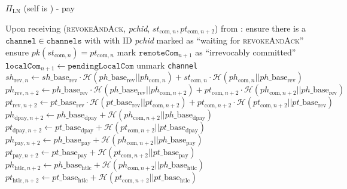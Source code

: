 \begin{protocolbox}{$\Pi_{\mathrm{LN}}$ (self is \alice) - pay}
\begin{algorithmic}[1]
    \State Upon receiving (\textsc{revokeAndAck}, \textit{pchid},
    $st_{\mathrm{com}, n}, pt_{\mathrm{com}, n+2}$) from \bob:
    \Indent
      \State ensure there is a $\mathtt{channel} \in \mathtt{channels}$ with
      \bob{} with ID \textit{pchid} marked as ``waiting for
      \textsc{revokeAndAck}''
      \State ensure $pk\left(st_{\mathrm{com}, n}\right) = pt_{\mathrm{com}, n}$
      \State mark $\mathtt{remoteCom}_{n+1}$ as ``irrevocably committed''
      \State $\mathtt{localCom}_{n+1} \gets \mathtt{pendingLocalCom}$
      \State unmark \texttt{channel}
      \State $sh_{\mathrm{rev}, n} \gets sh\_\mathrm{base}_{\mathrm{rev}} \cdot
      \mathcal{H}\left(ph\_\mathrm{base}_{\mathrm{rev}} || ph_{\mathrm{com},
      n}\right) + st_{\mathrm{com}, n} \cdot \mathcal{H}\left(ph_{\mathrm{com},
      n} || ph\_\mathrm{base}_{\mathrm{rev}}\right)$
      \State $ph_{\mathrm{rev}, n+2} \gets ph\_\mathrm{base}_{\mathrm{rev}}
      \cdot \mathcal{H}\left(ph\_\mathrm{base}_{\mathrm{rev}} ||
      ph_{\mathrm{com}, n+2}\right) + pt_{\mathrm{com}, n+2} \cdot
      \mathcal{H}\left(ph_{\mathrm{com}, n+2} ||
      ph\_\mathrm{base}_{\mathrm{rev}}\right)$
      \State $pt_{\mathrm{rev}, n+2} \gets pt\_\mathrm{base}_{\mathrm{rev}}
      \cdot \mathcal{H}\left(pt\_\mathrm{base}_{\mathrm{rev}} ||
      pt_{\mathrm{com}, n+2}\right) + pt_{\mathrm{com}, n+2} \cdot
      \mathcal{H}\left( pt_{\mathrm{com}, n+2} ||
      pt\_\mathrm{base}_{\mathrm{rev}}\right)$
      \State $ph_{\mathrm{dpay}, n+2} \gets ph\_\mathrm{base}_{\mathrm{dpay}} +
      \mathcal{H}\left(ph_{\mathrm{com}, n+2} ||
      ph\_\mathrm{base}_{\mathrm{dpay}}\right)$
      \State $pt_{\mathrm{dpay}, n+2} \gets pt\_\mathrm{base}_{\mathrm{dpay}} +
      \mathcal{H}\left(pt_{\mathrm{com}, n+2} ||
      pt\_\mathrm{base}_{\mathrm{dpay}}\right)$
      \State $ph_{\mathrm{pay}, n+2} \gets ph\_\mathrm{base}_{\mathrm{pay}} +
      \mathcal{H}\left(ph_{\mathrm{com}, n+2} ||
      ph\_\mathrm{base}_{\mathrm{pay}}\right)$
      \State $pt_{\mathrm{pay}, n+2} \gets pt\_\mathrm{base}_{\mathrm{pay}} +
      \mathcal{H}\left(pt_{\mathrm{com}, n+2} ||
      pt\_\mathrm{base}_{\mathrm{pay}}\right)$
      \State $ph_{\mathrm{htlc}, n+2} \gets ph\_\mathrm{base}_{\mathrm{htlc}} +
      \mathcal{H}\left(ph_{\mathrm{com}, n+2} ||
      ph\_\mathrm{base}_{\mathrm{htlc}}\right)$
      \State $pt_{\mathrm{htlc}, n+2} \gets pt\_\mathrm{base}_{\mathrm{htlc}} +
      \mathcal{H}\left(pt_{\mathrm{com}, n+2} ||
      pt\_\mathrm{base}_{\mathrm{htlc}}\right)$
    \EndIndent
    \State


\end{algorithmic}
\end{protocolbox}
